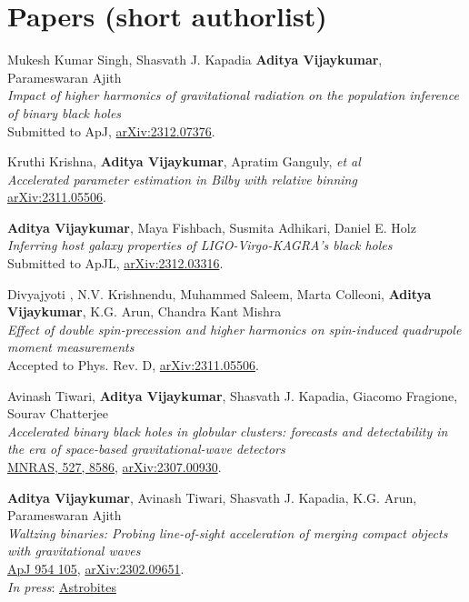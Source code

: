     \section{Papers (short authorlist)}
\begin{etaremune}
	\item
	Mukesh Kumar Singh, Shasvath J. Kapadia \textbf{Aditya Vijaykumar}, Parameswaran Ajith  \\
	\textit{Impact of higher harmonics of gravitational radiation on the population inference of binary black holes}\\
	Submitted to ApJ, \href{https://arxiv.org/abs/2312.07376}{arXiv:2312.07376}.

	\item
	Kruthi Krishna, \textbf{Aditya Vijaykumar}, Apratim Ganguly, \textit{et al}  \\
	\textit{Accelerated parameter estimation in Bilby with relative binning}\\
	\href{https://arxiv.org/abs/2311.05506}{arXiv:2311.05506}.

    \item
	\textbf{Aditya Vijaykumar}, Maya Fishbach, Susmita Adhikari, Daniel E. Holz  \\
	\textit{Inferring host galaxy properties of LIGO-Virgo-KAGRA's black holes
}\\
	Submitted to ApJL, \href{https://arxiv.org/abs/2312.03316}{arXiv:2312.03316}.

	\item
	Divyajyoti , N.V. Krishnendu, Muhammed Saleem, Marta Colleoni, \textbf{Aditya Vijaykumar}, K.G. Arun, Chandra Kant Mishra  \\
	\textit{Effect of double spin-precession and higher harmonics on spin-induced quadrupole moment measurements}\\
	Accepted to Phys. Rev. D, \href{https://arxiv.org/abs/2311.05506}{arXiv:2311.05506}.

	\item
	Avinash Tiwari, \textbf{Aditya Vijaykumar}, Shasvath J. Kapadia, Giacomo Fragione, Sourav Chatterjee  \\
	\textit{Accelerated binary black holes in globular clusters: forecasts and detectability in the era of space-based gravitational-wave detectors}\\
	\href{https://academic.oup.com/mnras/article/527/3/8586/7459933}{MNRAS, 527, 8586}, \href{https://arxiv.org/abs/2307.00930}{arXiv:2307.00930}.

	\item
	\textbf{Aditya Vijaykumar}, Avinash Tiwari, Shasvath J. Kapadia, K.G. Arun, Parameswaran Ajith  \\
	\textit{Waltzing binaries: Probing line-of-sight acceleration of merging compact objects with gravitational waves}\\
	\href{https://iopscience.iop.org/article/10.3847/1538-4357/acd77d}{ApJ 954 105}, \href{https://arxiv.org/abs/2302.09651}{arXiv:2302.09651}.\\
    \textit{In press}: \href{https://astrobites.org/2023/03/17/grab-doppler-dance-partner/}{Astrobites}
	

\end{etaremune}
